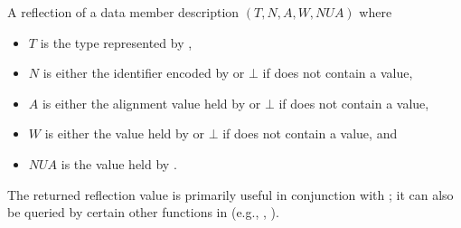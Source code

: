 \begin{itemdescr}
\pnum
\returns
A reflection of a data member description
$(T, N, A, W, \mathit{NUA})$ where
\begin{itemize}
\item
  $T$ is the type represented by ,
\item
  $N$ is either the identifier encoded by 
  or $\bot$ if  does not contain a value,
\item
  $A$ is either the alignment value held by 
  or $\bot$ if  does not contain a value,
\item
  $W$ is either the value held by 
  or $\bot$ if  does not contain a value, and
\item
  $\mathit{NUA}$ is the value held by .
\end{itemize}
\begin{note}
The returned reflection value is primarily useful
in conjunction with ;
it can also be queried by certain other functions in 
(e.g., , ).
\end{note}


\end{itemdescr}
